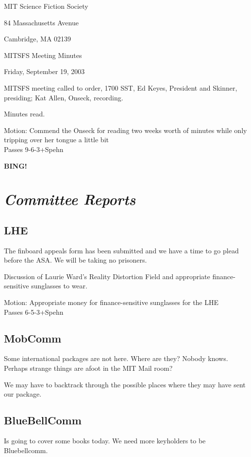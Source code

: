 \documentclass[10pt]{article}
\newcommand{\bing}{{\bf BING!} }
\newcommand{\goto}[1]{\bing \vskip 12pt \section*{{\em{#1}}}}
\begin{document}
\begin{center}

MIT Science Fiction Society 

84 Massachusetts Avenue

Cambridge, MA 02139

\vspace{12pt}

MITSFS Meeting Minutes 

Friday, September 19, 2003



\end{center}
 
\vspace{18pt}

\setlength{\parskip}{6pt}

\noindent
MITSFS meeting called to order, 1700 SST, Ed Keyes, President and
Skinner, presiding; Kat Allen,  Onseck, recording.

Minutes read.

Motion: Commend the Onseck for reading two weeks worth of minutes
while only tripping over her tongue a little bit \\
Passes 9-6-3+Spehn

\goto{Committee Reports}
\subsection*{LHE}
The finboard appeals form has been submitted and we have a time to go
plead before the ASA.  We will be taking no prisoners.

Discussion of Laurie Ward's Reality Distortion Field and appropriate
finance-sensitive sunglasses to wear.

Motion: Appropriate money for finance-sensitive sunglasses for the LHE\\
Passes 6-5-3+Spehn

\subsection*{MobComm}
Some international packages are not here. Where are they? Nobody
knows.  Perhaps strange things are afoot in the MIT Mail room?

We may have to backtrack through the possible places where they may
have sent our package.

\subsection*{BlueBellComm}
Is going to cover some books today. We need more keyholders to be Bluebellcomm.
\end{document}
